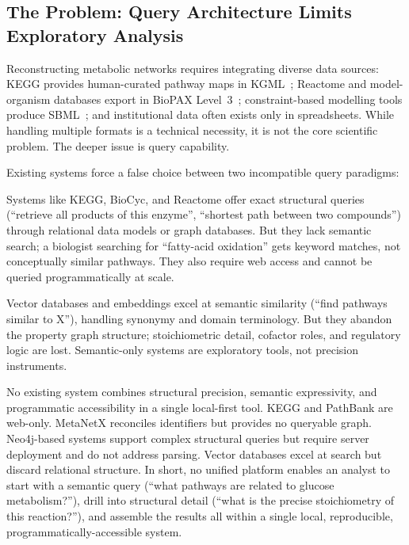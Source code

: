\documentclass[10pt]{article}
\begin{document}
\subsection{The Problem: Query Architecture Limits Exploratory Analysis}

Reconstructing metabolic networks requires integrating diverse data sources:
KEGG provides human-curated pathway maps in KGML~\citep{kanehisa2021kegg}; Reactome
and model-organism databases export in BioPAX Level~3~\citep{demir2010biopax};
constraint-based modelling tools produce SBML~\citep{keating2020sbml}; and
institutional data often exists only in spreadsheets. While handling multiple
formats is a technical necessity, it is not the core scientific problem. The
deeper issue is query capability.

Existing systems force a false choice between two incompatible query paradigms:

\begin{description}[leftmargin=*,itemsep=2pt]
  \item[Structural precision] Systems like KEGG, BioCyc, and Reactome offer
    exact structural queries (``retrieve all products of this enzyme'',
    ``shortest path between two compounds'') through relational data models or
    graph databases. But they lack semantic search; a biologist searching for
    ``fatty-acid oxidation'' gets keyword matches, not conceptually similar
    pathways. They also require web access and cannot be queried programmatically
    at scale.

  \item[Semantic expressivity] Vector databases and embeddings excel at
    semantic similarity (``find pathways similar to X''), handling synonymy and
    domain terminology. But they abandon the property graph structure; stoichiometric
    detail, cofactor roles, and regulatory logic are lost. Semantic-only systems
    are exploratory tools, not precision instruments.
\end{description}

No existing system combines structural precision, semantic expressivity, and
programmatic accessibility in a single local-first tool. KEGG and PathBank are
web-only. MetaNetX reconciles identifiers but provides no queryable graph.
Neo4j-based systems support complex structural queries but require server
deployment and do not address parsing. Vector databases excel at search but
discard relational structure. In short, no unified platform enables an analyst
to start with a semantic query (``what pathways are related to glucose
metabolism?''), drill into structural detail (``what is the precise
stoichiometry of this reaction?''), and assemble the results all within a single
local, reproducible, programmatically-accessible system.
\end{document}
